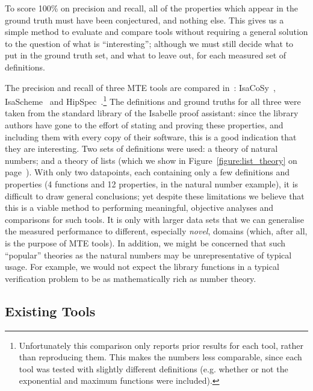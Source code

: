 To score 100\% on precision and recall, all of the properties which appear in
the ground truth must have been conjectured, and nothing else. This gives us a
simple method to evaluate and compare tools without requiring a general solution
to the question of what is ``interesting''; although we must still decide what
to put in the ground truth set, and what to leave out, for each measured set of
definitions.

\begin{sloppypar}
  The precision and recall of three MTE tools are compared
  in~\cite{claessen2013automating}:
  IsaCoSy~\cite{Johansson.Dixon.Bundy:conjecture-generation},
  IsaScheme~\cite{Montano-Rivas.McCasland.Dixon.ea:2012} and
  HipSpec~\cite{Claessen_hipspec:automating}.\footnote{Unfortunately this
    comparison only reports prior results for each tool, rather than reproducing
    them. This makes the numbers less comparable, since each tool was tested
    with slightly different definitions (e.g. whether or not the exponential and
    maximum functions were included).} The definitions and ground truths for all
  three were taken from the standard library of the Isabelle proof assistant:
  since the library authors have gone to the effort of stating and proving these
  properties, and including them with every copy of their software, this is a good
  indication that they are interesting. Two sets of definitions were used: a
  theory of natural numbers; and a theory of lists (which we show in
  Figure~\ref{figure:list_theory} on page~\pageref{figure:list_theory}). With
  only two datapoints, each containing only a few definitions and properties (4
  functions and 12 properties, in the natural number example), it is difficult
  to draw general conclusions; yet despite these limitations we believe that
  this is a viable method to performing meaningful, objective analyses and
  comparisons for such tools. It is only with larger data sets that we can
  generalise the measured performance to different, especially \emph{novel},
  domains (which, after all, is the purpose of MTE tools). In addition, we might
  be concerned that such ``popular'' theories as the natural numbers may be
  unrepresentative of typical usage. For example, we would not expect the
  library functions in a typical verification problem to be as mathematically
  rich as number theory.
\end{sloppypar}

\subsection{Existing Tools}
\label{sec:existing-tools}


